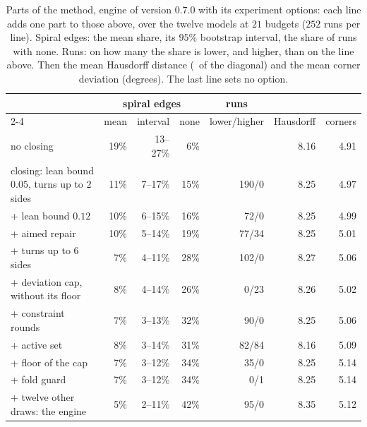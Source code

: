 \documentclass[11pt,a4paper]{article}
\begin{document}
\begin{table}[t]
\centering
\small
\setlength{\tabcolsep}{3.5pt}
\begin{tabular}{@{}lrrrrrr@{}}
\toprule
& \multicolumn{3}{c}{spiral edges} & \multicolumn{1}{c}{runs} & & \\
\cmidrule(lr){2-4}
& mean & interval & none & lower/higher & Hausdorff & corners \\
\midrule
no closing & 19\% & 13--27\% & 6\% & & 8.16 & 4.91 \\
closing: lean bound $0.05$, turns up to $2$ sides & 11\% & 7--17\% & 15\% & 190/0 & 8.25 & 4.97 \\
+ lean bound $0.12$ & 10\% & 6--15\% & 16\% & 72/0 & 8.25 & 4.99 \\
+ aimed repair & 10\% & 5--14\% & 19\% & 77/34 & 8.25 & 5.01 \\
+ turns up to $6$ sides & 7\% & 4--11\% & 28\% & 102/0 & 8.27 & 5.06 \\
+ deviation cap, without its floor & 8\% & 4--14\% & 26\% & 0/23 & 8.26 & 5.02 \\
+ constraint rounds & 7\% & 3--13\% & 32\% & 90/0 & 8.25 & 5.06 \\
+ active set & 8\% & 3--14\% & 31\% & 82/84 & 8.16 & 5.09 \\
+ floor of the cap & 7\% & 3--12\% & 34\% & 35/0 & 8.25 & 5.14 \\
+ fold guard & 7\% & 3--12\% & 34\% & 0/1 & 8.25 & 5.14 \\
+ twelve other draws: the engine & 5\% & 2--11\% & 42\% & 95/0 & 8.35 & 5.12 \\
\bottomrule
\end{tabular}
\caption{Parts of the method, engine of version 0.7.0 with its experiment
options: each line adds one part to those above, over the twelve models at
$21$ budgets ($252$ runs per line). Spiral edges: the mean share, its $95\%$
bootstrap interval, the share of runs with none. Runs: on how many the share
is lower, and higher, than on the line above. Then the mean Hausdorff
distance (\textperthousand\ of the diagonal) and the mean corner deviation
(degrees). The last line sets no option.}
\label{tab:dev}
\end{table}
\end{document}
